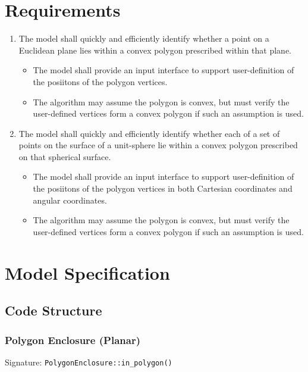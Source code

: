 \documentclass[11pt,fleqn]{report}
\begin{document}
\chapter{Requirements}
\begin{enumerate}
  \item The model shall quickly and efficiently identify whether a point on a
    Euclidean plane lies within a convex polygon prescribed within that plane.
  \begin{itemize}
    \item The model shall provide an input interface to support user-definition
      of the posiitons of the polygon vertices.
    \item The algorithm may assume the polygon is convex, but must verify the
      user-defined vertices form a convex polygon if such an assumption is
      used.
  \end{itemize}
  \item The model shall quickly and efficiently identify whether each of a
    set of points on the surface of a unit-sphere lie within a convex
    polygon prescribed on that spherical surface.
  \begin{itemize}
    \item The model shall provide an input interface to support user-definition
      of the posiitons of the polygon vertices in both Cartesian
      coordinates and angular coordinates.
    \item The algorithm may assume the polygon is convex, but must verify the
      user-defined vertices form a convex polygon if such an assumption is
      used.
  \end{itemize}
\end{enumerate}

\chapter{Model Specification}
\section{Code Structure}
\subsection{Polygon Enclosure (Planar)}
Signature: \texttt{PolygonEnclosure::in\_polygon()}
\end{document}
